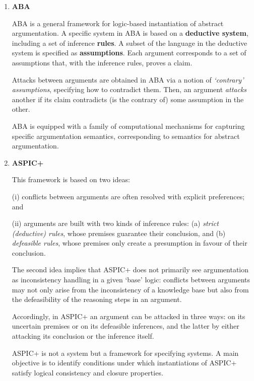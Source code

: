 \begin{enumerate}[itemsep=5pt,parsep=5pt,leftmargin=3em,topsep=5pt,label=(\arabic*)] %
    \item 
    \textbf{ABA}

    ABA is a general framework for logic-based instantiation of abstract argumentation. 
    A specific system in ABA is based on a \textbf{deductive system}, 
    including a set of inference \textbf{rules}. 
    A subset of the language in the deductive system is specified as \textbf{assumptions}. 
    Each argument corresponds to a set of assumptions that, with the inference rules, proves a claim. 
    
    Attacks between arguments are obtained in ABA via a notion of \textit{`contrary' assumptions}, 
    specifying how to contradict them. 
    Then, an argument \textit{attacks} another if its claim contradicts (is the contrary of) some assumption in the other. 
    
    ABA is equipped with a family of computational mechanisms for capturing specific argumentation semantics, corresponding to semantics for abstract argumentation.


    \item 
    \textbf{ASPIC+ }

    This framework is based on two ideas: 
    
    (i) conflicts between arguments are often resolved with explicit preferences;
    and 
    
    (ii) arguments are built with two kinds of inference rules: 
    (a) \textit{strict (deductive) rules}, whose premises guarantee their conclusion, 
    and (b) \textit{defeasible rules}, whose premises only create a presumption in favour of their conclusion. 
    
    The second idea implies that ASPIC+ does not primarily see argumentation as inconsistency handling in a given `base' logic: 
    conflicts between arguments may not only arise from the inconsistency of a knowledge base but also from the defeasibility of the reasoning steps in an argument.

    Accordingly, in ASPIC+
    an argument can  be attacked in three ways: 
    on its uncertain premises or on its defeasible inferences, 
    and the latter by either attacking its conclusion or the inference itself.

    ASPIC+ is not a system but a framework for specifying systems. 
    A main objective is to identify conditions under which instantiations of ASPIC+ satisfy logical consistency and closure properties.


\end{enumerate}
